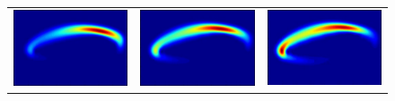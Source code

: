 \begin{figure}[H]
\begin{tabular}{ccc}
  \includegraphics[scale = 0.29]{QHO10.png} &   \includegraphics[scale = 0.29]{QHO11.png}   &   \includegraphics[scale = 0.29]{QHO12.png} \\

\end{tabular}
\end{figure}
